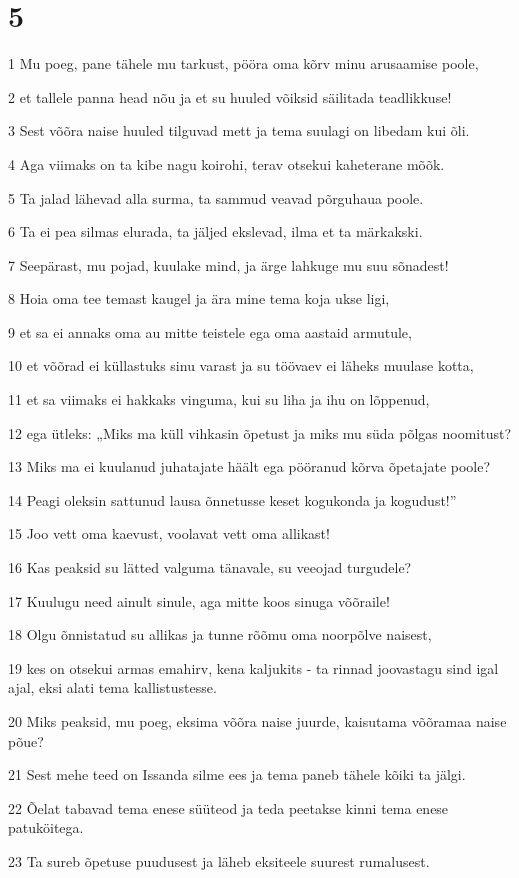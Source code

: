 \chapter{5}

\par 1 Mu poeg, pane tähele mu tarkust, pööra oma kõrv minu arusaamise poole,
\par 2 et tallele panna head nõu ja et su huuled võiksid säilitada teadlikkuse!
\par 3 Sest võõra naise huuled tilguvad mett ja tema suulagi on libedam kui õli.
\par 4 Aga viimaks on ta kibe nagu koirohi, terav otsekui kaheterane mõõk.
\par 5 Ta jalad lähevad alla surma, ta sammud veavad põrguhaua poole.
\par 6 Ta ei pea silmas elurada, ta jäljed ekslevad, ilma et ta märkakski.
\par 7 Seepärast, mu pojad, kuulake mind, ja ärge lahkuge mu suu sõnadest!
\par 8 Hoia oma tee temast kaugel ja ära mine tema koja ukse ligi,
\par 9 et sa ei annaks oma au mitte teistele ega oma aastaid armutule,
\par 10 et võõrad ei küllastuks sinu varast ja su töövaev ei läheks muulase kotta,
\par 11 et sa viimaks ei hakkaks vinguma, kui su liha ja ihu on lõppenud,
\par 12 ega ütleks: „Miks ma küll vihkasin õpetust ja miks mu süda põlgas noomitust?
\par 13 Miks ma ei kuulanud juhatajate häält ega pööranud kõrva õpetajate poole?
\par 14 Peagi oleksin sattunud lausa õnnetusse keset kogukonda ja kogudust!”
\par 15 Joo vett oma kaevust, voolavat vett oma allikast!
\par 16 Kas peaksid su lätted valguma tänavale, su veeojad turgudele?
\par 17 Kuulugu need ainult sinule, aga mitte koos sinuga võõraile!
\par 18 Olgu õnnistatud su allikas ja tunne rõõmu oma noorpõlve naisest,
\par 19 kes on otsekui armas emahirv, kena kaljukits - ta rinnad joovastagu sind igal ajal, eksi alati tema kallistustesse.
\par 20 Miks peaksid, mu poeg, eksima võõra naise juurde, kaisutama võõramaa naise põue?
\par 21 Sest mehe teed on Issanda silme ees ja tema paneb tähele kõiki ta jälgi.
\par 22 Õelat tabavad tema enese süüteod ja teda peetakse kinni tema enese patuköitega.
\par 23 Ta sureb õpetuse puudusest ja läheb eksiteele suurest rumalusest.

